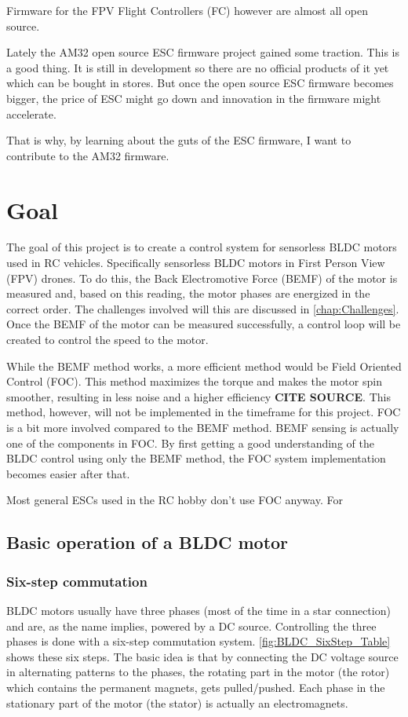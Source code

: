 \documentclass[]{report}
\begin{document}
Firmware for the FPV Flight Controllers (FC) however are almost all open source.

Lately the AM32 \cite{AM32_Git}\cite{AM32_RCGroups} open source ESC firmware project gained some traction. This is a good thing. It is still in development so there are no official products of it yet which can be bought in stores. But once the open source ESC firmware becomes bigger, the price of ESC might go down and innovation in the firmware might accelerate.

That is why, by learning about the guts of the ESC firmware, I want to contribute to the AM32 firmware.

\newpage


\chapter{Goal}

The goal of this project is to create a control system for sensorless BLDC motors used in RC vehicles. Specifically sensorless BLDC motors in First Person View (FPV) drones. To do this, the Back Electromotive Force (BEMF) of the motor is measured and, based on this reading, the motor phases are energized in the correct order. The challenges involved will this are discussed in \autoref{chap:Challenges}. Once the BEMF of the motor can be measured successfully, a control loop will be created to control the speed to the motor. 

While the BEMF method works, a more efficient method would be Field Oriented Control (FOC). This method maximizes the torque and makes the motor spin smoother, resulting in less noise and a higher efficiency \textbf{CITE SOURCE}. This method, however, will not be implemented in the timeframe for this project. FOC is a bit more involved compared to the BEMF method. BEMF sensing is actually one of the components in FOC. By first getting a good understanding of the BLDC control using only the BEMF method, the FOC system implementation becomes easier after that.

Most general ESCs used in the RC hobby don't use FOC anyway. For 

\section{Basic operation of a BLDC motor}
\subsection{Six-step commutation}
BLDC motors usually have three phases (most of the time in a star connection) and are, as the name implies, powered by a DC source. Controlling the three phases is done with a six-step commutation system. \autoref{fig:BLDC_SixStep_Table} shows these six steps. The basic idea is that by connecting the DC voltage source in alternating patterns to the phases, the rotating part in the motor (the rotor) which contains the permanent magnets, gets pulled/pushed. Each phase in the stationary part of the motor (the stator) is actually an electromagnets.
\end{document}
